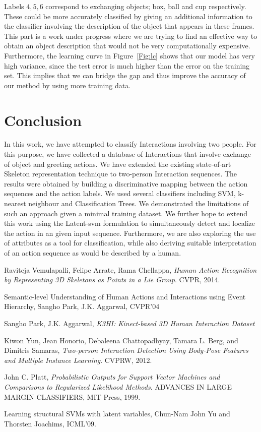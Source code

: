 \documentclass[10pt,twocolumn,letterpaper]{article}
\begin{document}
Labels ${4,5,6}$ correspond to exchanging objects; box, ball and cup respectively. These could be more accurately classified by giving an additional information to the classifier involving the description of the object that appears in these frames. This part is a work under progress where we are trying to find an effective way to obtain an object description that would not be very computationally expensive. 
Furthermore, the learning curve in Figure~\ref{Fig:lc} shows that our model has very high variance, since the test error is much higher than the error on the training set. This implies that we can bridge the gap and thus improve the accuracy of our method by using more training data. 

\section{Conclusion}
In this work, we have attempted to classify Interactions involving two people. For this purpose, we have collected a database of Interactions that involve exchange of object and greeting actions. We have extended the existing state-of-art Skeleton representation technique to two-person Interaction sequences. The results were obtained by building a discriminative mapping between the action sequences and the action labels. We used several classifiers including SVM, k-nearest neighbour and Classification Trees. We demonstrated the limitations of such an approach given a minimal training dataset. We further hope to extend this work using the Latent-svm formulation to simultaneously detect and localize the action in an given input sequence. Furthermore, we are also exploring the use of attributes as a tool for classification, while also deriving suitable interpretation of an action sequence as would be described by a human. 

\begin{thebibliography}{9}

  Raviteja  Vemulapalli,
  Felipe Arrate,
  Rama Chellappa,
  \emph{Human Action Recognition by Representing 3D Skeletons as Points in a Lie Group}.
  CVPR,
  2014.

 Semantic-level Understanding of Human Actions and Interactions using Event Hierarchy, Sangho Park, J.K. Aggarwal, CVPR'04

	Sangho Park,
	J.K. Aggarwal,
	\emph{K3HI: Kinect-based 3D Human Interaction Dataset}

	Kiwon Yun, Jean Honorio, Debaleena Chattopadhyay, Tamara L. Berg, and Dimitris Samaras,
	\emph{Two-person Interaction Detection Using Body-Pose Features and Multiple Instance Learning}.
	CVPRW,
	2012.
	
	John C. Platt,
	\emph{Probabilistic Outputs for Support Vector Machines and Comparisons to Regularized Likelihood Methods}.
	ADVANCES IN LARGE MARGIN CLASSIFIERS, MIT Press, 1999.
	 
	

 Learning structural SVMs with latent variables, Chun-Nam John Yu and Thorsten Joachims, ICML'09.



\end{thebibliography}
\end{document}
